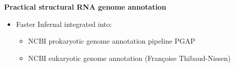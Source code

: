 \documentclass[landscape]{slides}
\begin{document}
\begin{slide}
\begin{center}
\textbf{Practical structural RNA genome annotation}
\end{center}

\begin{itemize}
  \item Faster Infernal integrated into:
    \begin {itemize}
    \item
      NCBI prokaryotic genome annotation pipeline PGAP
    \item
      NCBI eukaryotic genome annotation (Fran\c{c}oise Thibaud-Nissen)
    \end{itemize}
\end{itemize}    

\medskip

\vfill
\end{slide}
\begin{slide}



\vfill
\end{slide}
\end{document}
